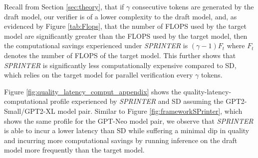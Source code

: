 \documentclass{article}
\theoremstyle{plain}
\theoremstyle{definition}
\theoremstyle{remark}
\begin{document}
Recall from Section \ref{sec:theory}, that if $\gamma$ consecutive tokens are generated by the draft model, our verifier is of a lower complexity to the draft model, and, as evidenced by Figure \ref{tab:Flops}, that the number of FLOPS used by the target model are significantly greater than the FLOPS used by the target model, then the computational savings experienced under \textit{SPRINTER} is $(\gamma-1)F_t$ where $F_t$ denotes the number of FLOPS of the target model. This further shows that \textit{SPRINTER} is significantly less computationally expensive compared to SD, which relies on the target model for parallel verification every $\gamma$ tokens.

 Figure \ref{fig:quality_latency_comput_appendix} shows the quality-latency-computational profile experienced by \textit{SPRINTER} and SD assuming the GPT2-Small/GPT2-XL model pair. Similar to Figure \ref{fig:frameworkSPrinter}, which shows the same profile for the GPT-Neo model pair, we observe that \textit{SPRINTER} is able to incur a lower latency than SD while suffering a minimal dip in quality and incurring more computational savings by running inference on the draft model more frequently than the target model. 

\end{document}
